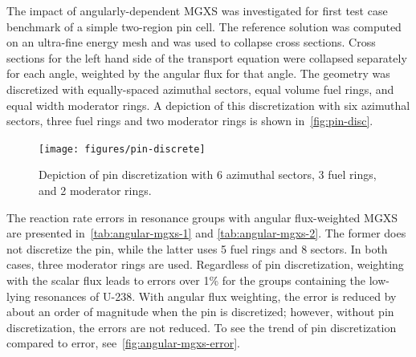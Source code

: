 The impact of angularly-dependent MGXS was investigated for first test case benchmark of a simple two-region pin cell. The reference solution was computed on an ultra-fine energy mesh and was used to collapse cross sections. Cross sections for the left hand side of the transport equation were collapsed separately for each angle, weighted by the angular flux for that angle. The geometry was discretized with equally-spaced azimuthal sectors, equal volume fuel rings, and equal width moderator rings.  A depiction of this discretization with six azimuthal sectors, three fuel rings and two moderator rings is shown in~\autoref{fig:pin-disc}.

\begin{figure}
\centering
\caption{Depiction of pin discretization with 6 azimuthal sectors, 3 fuel rings, and 2 moderator rings.}
\label{fig:pin-disc}
\texttt{[image: figures/pin-discrete]}
\end{figure}

The reaction rate errors in resonance groups with angular flux-weighted MGXS are presented in~\autoref{tab:angular-mgxs-1} and \autoref{tab:angular-mgxs-2}.  The former does not discretize the pin, while the latter uses 5 fuel rings and 8 sectors.  In both cases, three moderator rings are used.  Regardless of pin discretization, weighting with the scalar flux leads to errors over 1\% for the groups containing the low-lying resonances of U-238.  With angular flux weighting, the error is reduced by about an order of magnitude when the pin is discretized; however, without pin discretization, the errors are not reduced.  To see the trend of pin discretization compared to error, see~\autoref{fig:angular-mgxs-error}.

